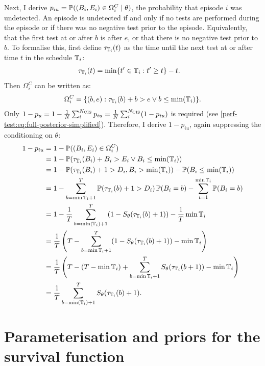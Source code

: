 \documentclass[thesis.tex]{subfiles}
\begin{document}
Next, I derive $p_{iu} = \operatorname{\mathbb{P}}((B_i, E_i) \in \Omega^C_i \mid \theta)$, the probability that episode $i$ was undetected.
An episode is undetected if and only if no tests are performed during the episode or if there was no negative test prior to the episode.
Equivalently, that the first test at or after $b$ is after $e$, or that there is no negative test prior to $b$.
To formalise this, first define $\tau_{\mathbb{T}_i}(t)$ as the time until the next test at or after time $t$ in the schedule $\mathbb{T}_i$:
\begin{align}
\tau_{\mathbb{T}_i}(t) &= \min \{ t' \in \mathbb{T}_i : t' \geq t \} - t.
\end{align}
Then $\Omega^C_i$ can be written as:
\begin{align}
\Omega_i^C = \{ (b, e) : \tau_{\mathbb{T}_i}(b) + b > e \vee b \leq \min(\mathbb{T}_i) \}.
\end{align}
Only $1 - p_u = 1 - \frac{1}{N} \sum_i^{N_\text{CIS}} p_{iu} = \frac{1}{N} \sum_i^{N_\text{CIS}} (1 - p_{iu})$ is required (see \cref{perf-test:eq:full-posterior-simplified}).
Therefore, I derive $1 - p_{iu}$, again suppressing the conditioning on $\theta$:
\begin{align}
1 - p_{iu}
&= 1 - \operatorname{\mathbb{P}}((B_i, E_i) \in \Omega^C_i) \\
&= 1 - \operatorname{\mathbb{P}}( \tau_{\mathbb{T}_i}(B_i) + B_i > E_i \vee B_i \leq \min(\mathbb{T}_i) ) \\
&= 1 - \operatorname{\mathbb{P}}( \tau_{\mathbb{T}_i}(B_i) + 1 > D_i , B_i > \min(\mathbb{T}_i) )  - \operatorname{\mathbb{P}}( B_i \leq \min(\mathbb{T}_i) ) \\
&= 1 - \sum_{b={\min\mathbb{T}_i} + 1}^T \operatorname{\mathbb{P}}( \tau_{\mathbb{T}_i}(b) + 1> D_i) \operatorname{\mathbb{P}}(B_i = b) - \sum_{t=1}^{\min\mathbb{T}_i} \operatorname{\mathbb{P}}(B_i = b)\\
&= 1 - \frac{1}{T} \sum_{b=\min(\mathbb{T}_i)+1}^T (1 - S_\theta(\tau_{\mathbb{T}_i}(b) + 1)) - \frac{1}{T} \min\mathbb{T}_i \\
&= \frac{1}{T} \left(T - \sum_{b=\min\mathbb{T}_i+1}^T (1 - S_\theta(\tau_{\mathbb{T}_i}(b) + 1)) - \min\mathbb{T}_i \right) \\
&= \frac{1}{T} \left(T - (T - \min\mathbb{T}_i) + \sum_{b=\min\mathbb{T}_i+1}^T S_\theta(\tau_{\mathbb{T}_i}(b + 1)) - \min\mathbb{T}_i \right) \\
&= \frac{1}{T} \sum_{b=\min(\mathbb{T}_i)+1}^T S_\theta(\tau_{\mathbb{T}_i}(b) + 1). \label{perf-test:eq:piu}
\end{align}


\section{Parameterisation and priors for the survival function} \label{perf-test:sec:parameters-priors}
\end{document}

